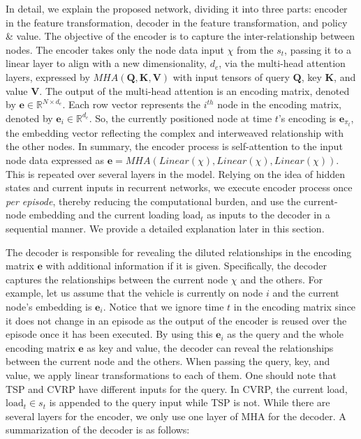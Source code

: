 \documentclass{article}
\newcommand\HWG[1]{ {\color{blue}#1} }
\begin{document}
In detail, we explain the proposed network, dividing it into three parts: encoder in the feature transformation, decoder in the feature transformation, and policy \& value. The objective of the encoder is to capture the inter-relationship between nodes. The encoder takes only the node data input $\chi$ from the $s_t$, passing it to a linear layer to align with a new dimensionality, $d_e$, via the multi-head attention layers, expressed by $MHA(\boldsymbol{Q}, \boldsymbol{K}, \boldsymbol{V})$ with input tensors of query $\boldsymbol{Q}$, key $\boldsymbol{K}$, and value $\boldsymbol{V}$. The output of the multi-head attention is an encoding matrix, denoted by $\mathbf{e} \in \mathbb{R}^{N \times d_e}$. Each row vector represents the $i^{th}$ node in the encoding matrix, denoted by $\mathbf{e}_i \in \mathbb{R}^{d_e}$. So, the currently positioned node at time $t$'s encoding is $\mathbf{e}_{\pi_t}$, the embedding vector reflecting the complex and interweaved relationship with the other nodes. In summary, the encoder process is self-attention to the input node data expressed as $\mathbf{e} = MHA(Linear(\chi), Linear(\chi), Linear(\chi))$. This is repeated over several layers in the model. Relying on the idea of hidden states and current inputs in recurrent networks, we execute encoder process once \textit{per episode}, thereby reducing the computational burden, and use the current-node embedding and the current loading $\mbox{load}_t$ as inputs to the decoder in a sequential manner. We provide a detailed explanation later in this section.

The decoder is responsible for revealing the diluted relationships in the encoding matrix $\mathbf{e}$ with additional information if it is given. Specifically, the decoder captures the relationships between the current node $\chi$ and the others. For example, let us assume that the vehicle is currently on node $i$ and the current node's embedding is $\mathbf{e}_i$. Notice that we ignore time $t$ in the encoding matrix since it does not change in an episode as the output of the encoder is reused over the episode once it has been executed. %
By using this $\mathbf{e}_i$ as the query and the whole encoding matrix $\mathbf{e}$ as key and value, the decoder can reveal the relationships between the current node and the others. When passing the query, key, and value, we apply linear transformations to each of them. One should note that TSP and CVRP have different inputs for the query. In CVRP, the current load, $\mbox{load}_t \in s_t$ is appended to the query input while TSP is not. While there are several layers for the encoder, we only use one layer of MHA for the decoder. A summarization of the decoder is as follows:
\end{document}

